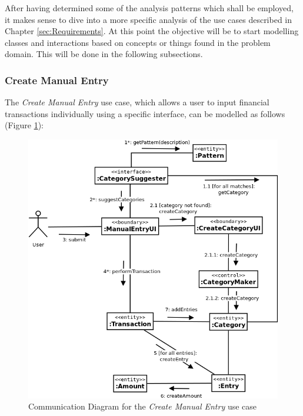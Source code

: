 After having determined some of the analysis patterns which shall be employed,
it makes sense to dive into a more specific analysis of the use cases described
in Chapter \ref{sec:Requirements}. At this point the objective will be to start
modelling classes and interactions based on concepts or things found in the
problem domain. This will be done in the following subsections.

\subsubsection{Create Manual Entry} \label{sec:AnalysisAndDesign.BusinessLogic.ManualEntry}

The \emph{Create Manual Entry} use case, which allows a
user to input financial transactions individually using a specific interface,
can be modelled as follows (Figure \ref{fig:CommDiagram.CreateManualEntry}):
\begin{figure}[ht!]
  \begin{center}
    \includegraphics[width=12cm]{./contents/img/Comm_Diagram_-_Manual_Entry.png}
  \end{center}
  \caption{Communication Diagram for the \emph{Create Manual Entry} use case}
  \label{fig:CommDiagram.CreateManualEntry}
\end{figure}
\FloatBarrier

